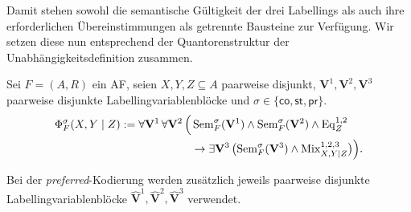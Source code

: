 Damit stehen sowohl die semantische Gültigkeit der drei Labellings als
auch ihre erforderlichen Übereinstimmungen als getrennte Bausteine zur
Verfügung. Wir setzen diese nun entsprechend der Quantorenstruktur der
Unabhängigkeitsdefinition zusammen.
\begin{Definition}
    \label{def:generic-independence-qbf}
    Sei \(F=(A,R)\) ein AF, seien \(X,Y,Z\subseteq A\) paarweise disjunkt, \(\mathbf V^1, 
    \mathbf V^2, \mathbf V^3\) paarweise disjunkte Labellingvariablenblöcke und
    \(\sigma\in\{\mathsf{co},\mathsf{st},\mathsf{pr}\}\).
    \[
    \begin{split}
        \Phi^\sigma_F(X,Y\mid Z)
        :=\forall\mathbf V^1\,\forall\mathbf V^2\,
        \Bigl(&
            \operatorname{Sem}^{\sigma}_F(\mathbf V^1)
            \land
            \operatorname{Sem}^{\sigma}_F(\mathbf V^2)
            \land
            \operatorname{Eq}^{1,2}_Z
        \\
        &\rightarrow
        \exists\mathbf V^3\,
        \bigl(
            \operatorname{Sem}^{\sigma}_F(\mathbf V^3)
            \land
            \operatorname{Mix}^{1,2,3}_{X,Y\mid Z}
        \bigr)
        \Bigr).
    \end{split}
    \]
\end{Definition}
Bei der \emph{preferred}-Kodierung werden zusätzlich jeweils
paarweise disjunkte Labellingvariablenblöcke
\(\widehat{\mathbf V}^{1},
\widehat{\mathbf V}^{2},
\widehat{\mathbf V}^{3}\)
verwendet.

